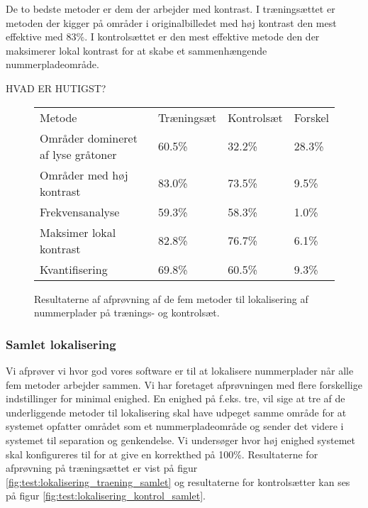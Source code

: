 De to bedste metoder er dem der arbejder med kontrast. I træningsættet er metoden der kigger på områder i originalbilledet med høj kontrast den mest effektive med 83\%. I kontrolsættet er den mest effektive metode den der maksimerer lokal kontrast for at skabe et sammenhængende nummerpladeområde. 

HVAD ER HUTIGST?

\begin{figure}[htp]
\centering
\begin{tabular}{|l|l|l|l|}
\hline
\rowcolor[gray]{0.9} \multicolumn{4}{|>{\columncolor[gray]{0.9}}c|}{\textbf{Individuelle metoder til lokalisering}} \\ \hline
Metode & Træningsæt & Kontrolsæt & Forskel \\ \hline
Områder domineret af lyse gråtoner & 60.5\% & 32.2\% & 28.3\% \\ \hline
Områder med høj kontrast           & 83.0\% & 73.5\% &  9.5\% \\ \hline
Frekvensanalyse                    & 59.3\% & 58.3\% &  1.0\% \\ \hline
Maksimer lokal kontrast            & 82.8\% & 76.7\% &  6.1\% \\ \hline
Kvantifisering                     & 69.8\% & 60.5\% &  9.3\% \\ \hline
\end{tabular}
\caption{Resultaterne af afprøvning af de fem metoder til lokalisering af nummerplader på trænings- og kontrolsæt.}
\label{fig:test:lokalisering_traening_kontrol}
\end{figure}


\subsubsection{Samlet lokalisering}
Vi afprøver vi hvor god vores software er til at lokalisere nummerplader når alle fem metoder arbejder sammen. Vi har foretaget afprøvningen med flere forskellige indstillinger for minimal enighed. En enighed på f.eks. tre, vil sige at tre af de underliggende metoder til lokalisering skal have udpeget samme område for at systemet opfatter området som et nummerpladeområde og sender det videre i systemet til separation og genkendelse. Vi undersøger hvor høj enighed systemet skal konfigureres til for at give en korrekthed på 100\%. Resultaterne for afprøvning på træningsættet er vist på figur \vref{fig:test:lokalisering_traening_samlet} og resultaterne for kontrolsætter kan ses på figur \ref{fig:test:lokalisering_kontrol_samlet}.

